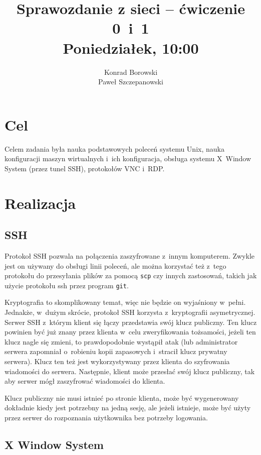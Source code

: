 \documentclass[a4paper,11pt]{article}
\title{Sprawozdanie z sieci -- ćwiczenie 0~i~1\\Poniedziałek, 10:00}
\author{Konrad Borowski\\Paweł Szczepanowski}
\begin{document}
\thispagestyle{empty}                   %

\maketitle

\section{Cel}

Celem zadania była nauka podstawowych poleceń systemu Unix, nauka
konfiguracji maszyn wirtualnych i~ich konfiguracja, obsługa systemu
X~Window System (przez tunel SSH), protokołów VNC i~RDP.

\section{Realizacja}

\subsection{SSH}

Protokoł SSH pozwala na połączenia zaszyfrowane z~innym komputerem. Zwykle
jest on używany do obsługi linii poleceń, ale można korzystać też z~tego
protokołu do przesyłania plików za pomocą \verb|scp| czy innych zastosowań,
takich jak użycie protokołu ssh przez program \verb|git|.

Kryptografia to skomplikowany temat, więc nie będzie on wyjaśniony w~pełni.
Jednakże, w~dużym skrócie, protokoł SSH korzysta z~kryptografii asymetrycznej.
Serwer SSH z~którym klient się łączy przedstawia swój klucz publiczny. Ten
klucz powinien być już znany przez klienta w~celu zweryfikowania tożsamości,
jeżeli ten klucz nagle się zmieni, to prawdopodobnie wystąpił atak (lub
administrator serwera zapomniał o~robieniu kopii zapasowych i~stracił
klucz prywatny serwera). Klucz ten też jest wykorzystywany przez klienta
do szyfrowania wiadomości do serwera. Następnie, klient może przesłać swój
klucz publiczny, tak aby serwer mógł zaszyfrować wiadomości do klienta.

Klucz publiczny nie musi istnieć po stronie klienta, może być wygenerowany
dokładnie kiedy jest potrzebny na jedną sesję, ale jeżeli istnieje, może
być użyty przez serwer do rozpoznania użytkownika bez potrzeby logowania.

\subsection{X Window System}
\end{document}
